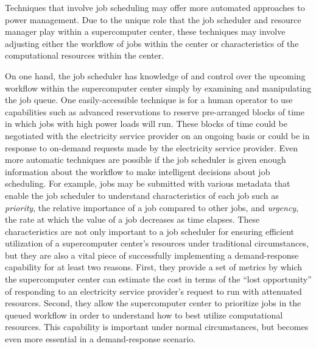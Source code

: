 Techniques that involve job scheduling may offer more automated
approaches to power management.  Due to the unique role that the job
scheduler and resource manager play within a supercomputer center,
these techniques may involve adjusting either the workflow of jobs
within the center or characteristics of the computational resources
within the center.

On one hand, the job scheduler has knowledge of and control over the
upcoming workflow within the supercomputer center simply by examining
and manipulating the job queue.  One easily-accessible technique is
for a human operator to use capabilities such as advanced reservations
to reserve pre-arranged blocks of time in which jobs with high power
loads will run.  These blocks of time could be negotiated with the
electricity service provider on an ongoing basis or could be in response to
on-demand requests made by the electricity service provider.  Even more
automatic techniques are possible if the job scheduler is given enough
information about the workflow to make intelligent decisions about job
scheduling.  For example, jobs may be submitted with various metadata
that enable the job scheduler to understand characteristics of each
job such as \textit{priority}, the relative importance of a job
compared to other jobs, and \textit{urgency}, the rate at which the
value of a job decreases as time elapses.  These characteristics are
not only important to a job scheduler for ensuring efficient
utilization of a supercomputer center's resources under traditional
circumstances, but they are also a vital piece of successfully
implementing a demand-response capability for at least two reasons.
First, they provide a set of metrics by which the supercomputer center
can estimate the cost in terms of the ``lost opportunity'' of
responding to an electricity service provider's request to run with
attenuated resources.  Second, they allow the supercomputer center to
prioritize jobs in the queued workflow in order to understand how to
best utilize computational resources.  This capability is important
under normal circumstances, but becomes even more essential in a
demand-response scenario.


